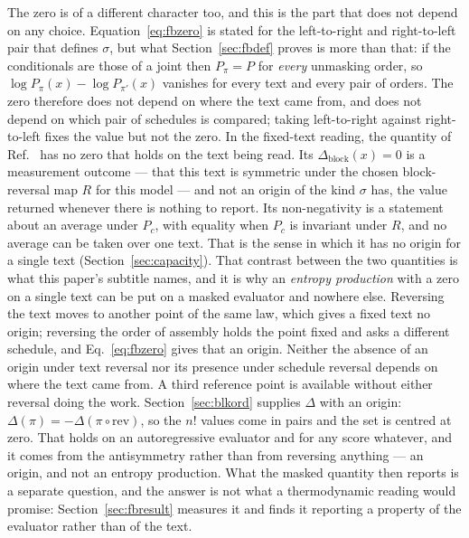 \documentclass[11pt]{article}
\newcommand{\Dblock}{\Delta_{\mathrm{block}}}
\begin{document}
The zero is of a different character too, and this is the part that does not
depend on any choice.  Equation~\eqref{eq:fbzero} is stated for the
left-to-right and right-to-left pair that defines $\sigma$, but what
Section~\ref{sec:fbdef} proves is more than that: if the conditionals are
those of a joint then $P_\pi = P$ for \emph{every} unmasking order, so $\log P_\pi(x) - \log P_{\pi'}(x)$ vanishes
for every text and every pair of orders.  The zero therefore does not depend
on where the text came from, and does not depend on which pair of schedules
is compared; taking left-to-right against right-to-left fixes the value but
not the zero.  In the fixed-text reading, the quantity of
Ref.~\cite{sagawa2026} has no zero that holds on the text being read.  Its $\Dblock(x) = 0$ is a measurement outcome ---
that this text is symmetric under the chosen block-reversal map $R$ for
this model --- and not an origin of the kind $\sigma$ has, the value
returned whenever there is nothing to report.  Its non-negativity is a
statement about an average under $P_c$, with equality when $P_c$ is
invariant under $R$, and no average can be taken over one text.  That is
the sense in which it has no origin for a single text
(Section~\ref{sec:capacity}).
That contrast between the two quantities is what this paper's subtitle
names, and it is why an \emph{entropy
production} with a zero on a single text can be put on a masked evaluator
and nowhere else.  Reversing the text moves to another point of the same
law, which gives a fixed text no origin; reversing the order of assembly
holds the point fixed and asks a different schedule, and
Eq.~\eqref{eq:fbzero} gives that an origin.  Neither the absence of an
origin under text reversal nor its presence under schedule reversal depends
on where the text came from.  A third reference point is available without either reversal doing the
work.  Section~\ref{sec:blkord} supplies
$\Delta$ with an origin: $\Delta(\pi) = -\Delta(\pi \circ \mathrm{rev})$, so
the $n!$ values come in pairs and the set is centred at zero.  That holds on
an autoregressive evaluator and for any score whatever, and it comes from
the antisymmetry rather than from reversing anything --- an origin, and not
an entropy production.  What the masked quantity then
reports is a separate question, and the answer is not what a thermodynamic
reading would promise: Section~\ref{sec:fbresult} measures it
and finds it reporting a property of the evaluator rather than of the text.
\end{document}
